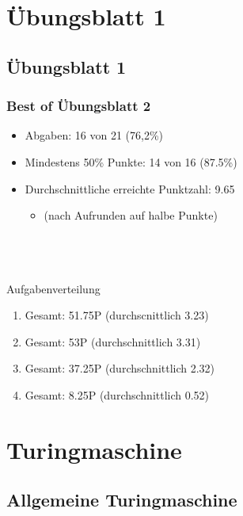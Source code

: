 


\section{Übungsblatt 1}
\subsection{Übungsblatt 1}

\begin{frame}
\frametitle{Best of Übungsblatt 2}
\begin{itemize}
	\item Abgaben: 16 von 21 (76,2\%)
	\item Mindestens 50\% Punkte: 14 von 16 (87.5\%)
	\item Durchschnittliche erreichte Punktzahl: 9.65
	\begin{itemize}
		\item (nach Aufrunden auf halbe Punkte)
	\end{itemize}
\end{itemize}~\\~\\~\\
Aufgabenverteilung
\begin{enumerate}[{A}ufg{a}be 1:]
	\item Gesamt: 51.75P (durchscnittlich 3.23)
	\item Gesamt: 53P (durchschnittlich 3.31)
	\item Gesamt: 37.25P (durchschnittlich 2.32)
	\item Gesamt: 8.25P (durchschnittlich 0.52)
\end{enumerate}
\end{frame}

\section{Turingmaschine}
\subsection{Allgemeine Turingmaschine}

